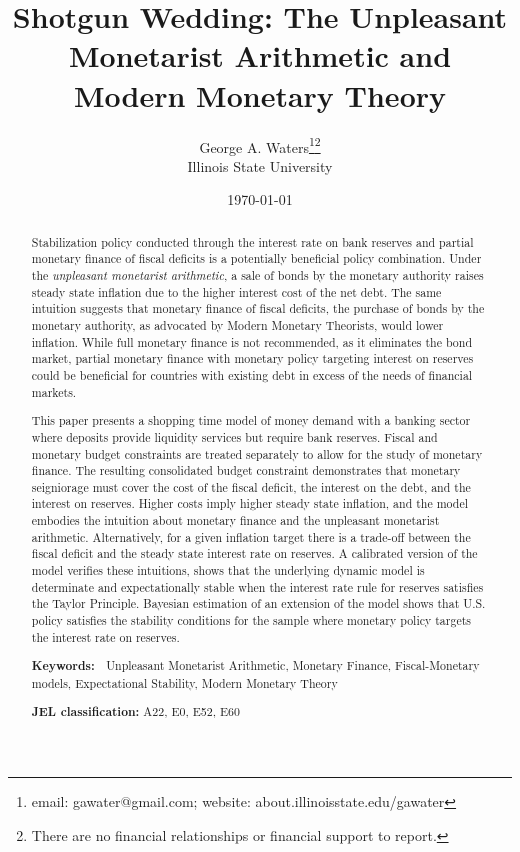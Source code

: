 \documentclass[]{article}
\begin{document}
\title{Shotgun Wedding: The Unpleasant Monetarist Arithmetic and Modern Monetary Theory}
\date{\textsf{\today}}
\author{George A. Waters\footnote{email:  gawater@gmail.com;  website:  about.illinoisstate.edu/gawater}\footnote{There are no financial relationships or financial support to report.}
\\Illinois State University}
\maketitle


\begin{abstract}
Stabilization policy conducted through the interest rate on bank reserves and partial monetary finance of fiscal deficits is a potentially beneficial policy combination. Under the \textit{unpleasant monetarist arithmetic}, a sale of bonds by the monetary authority raises steady state inflation due to the higher interest cost of the net debt. The same intuition suggests that monetary finance of fiscal deficits, the purchase of bonds by the monetary authority, as advocated by Modern Monetary Theorists, would lower inflation. While full monetary finance is not recommended, as it eliminates the bond market, partial monetary finance with monetary policy targeting interest on reserves could be beneficial for countries with existing debt in excess of the needs of financial markets.

This paper presents a shopping time model of money demand with a banking sector where deposits provide liquidity services but require bank reserves. Fiscal and monetary budget constraints are treated separately to allow for the study of monetary finance. The resulting consolidated budget constraint demonstrates that monetary seigniorage must cover the cost of the fiscal deficit, the interest on the debt, and the interest on reserves. Higher costs imply higher steady state inflation, and the model embodies the intuition about monetary finance and the unpleasant monetarist arithmetic. Alternatively, for a given inflation target there is a trade-off between the fiscal deficit and the steady state interest rate on reserves. A calibrated version of the model verifies these intuitions, shows that the underlying dynamic model is determinate and expectationally stable when the interest rate rule for reserves satisfies the Taylor Principle. Bayesian estimation of an extension of the model shows that U.S. policy satisfies the stability conditions for the sample where monetary policy targets the interest rate on reserves.

\textbf{Keywords: \ }Unpleasant Monetarist
Arithmetic, Monetary Finance, Fiscal-Monetary models, Expectational Stability, Modern Monetary Theory

\textbf{JEL classification: }A22, E0, E52, E60
\end{abstract}
\end{document}
